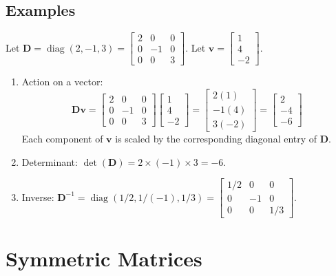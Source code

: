 \documentclass{article}
\newcommand{\vect}[1]{\bm{#1}} %
\newcommand{\mat}[1]{\bm{#1}}  %
\DeclareMathOperator{\diag}{diag}  %
\begin{document}
\subsection*{Examples}
Let $\mat{D} = \diag(2, -1, 3) = \begin{bmatrix} 2 & 0 & 0 \\ 0 & -1 & 0 \\ 0 & 0 & 3 \end{bmatrix}$. Let $\vect{v} = \begin{bmatrix} 1 \\ 4 \\ -2 \end{bmatrix}$.
\begin{enumerate}
    \item Action on a vector:
    \[ \mat{D}\vect{v} = \begin{bmatrix} 2 & 0 & 0 \\ 0 & -1 & 0 \\ 0 & 0 & 3 \end{bmatrix} \begin{bmatrix} 1 \\ 4 \\ -2 \end{bmatrix} = \begin{bmatrix} 2(1) \\ -1(4) \\ 3(-2) \end{bmatrix} = \begin{bmatrix} 2 \\ -4 \\ -6 \end{bmatrix} \]
    Each component of $\vect{v}$ is scaled by the corresponding diagonal entry of $\mat{D}$.
    \item Determinant: $\det(\mat{D}) = 2 \times (-1) \times 3 = -6$.
    \item Inverse: $\mat{D}^{-1} = \diag(1/2, 1/(-1), 1/3) = \begin{bmatrix} 1/2 & 0 & 0 \\ 0 & -1 & 0 \\ 0 & 0 & 1/3 \end{bmatrix}$.
\end{enumerate}

\section{Symmetric Matrices}
\end{document}
